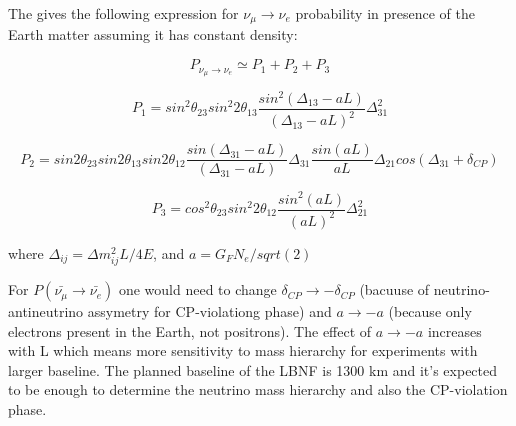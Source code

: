 The \cite{ref_LBNFdoc_volume-physics} gives the following expression for $\nu_\mu \rightarrow \nu_e$ probability in presence of the Earth matter assuming it has constant density: \\
\begin{center}

\begin{equation}
\label{eq:P_bigFormula}
P_{\nu_\mu \rightarrow \nu_e} \simeq P_1 + P_2 + P_3 
\end{equation}

\begin{equation}
\label{eq:P_bigFormula_1}
P_1 = sin^2{\theta_{23}}sin^2{2\theta_{13}}\frac{sin^2(\Delta_{13}-aL)}{(\Delta_{13}-aL)^2}\Delta^2_{31}
\end{equation}

\begin{equation}
\label{eq:P_bigFormula_2}
P_2 = sin2\theta_{23}sin2\theta_{13}sin2\theta_{12}\frac{sin(\Delta_{31}-aL)}{(\Delta_{31}-aL)}\Delta_{31}\frac{sin(aL)}{aL}\Delta_{21}cos(\Delta_{31}+\delta_{CP})
\end{equation}

\begin{equation}
\label{eq:P_bigFormula_3}
P_3 = cos^2\theta_{23}sin^2{2\theta_{12}}\frac{sin^2(aL)}{(aL)^2}\Delta^2_{21}
\end{equation}

where $\Delta_{ij}={\Delta}m^2_{ij}L/4E$, and $a={G_F}{N_e}/sqrt(2)$\\
\end{center}

For $P(\bar{\nu_\mu} \rightarrow \bar{\nu_e})$ one would need to change $\delta_{CP} \rightarrow -\delta_{CP}$ (bacuuse of neutrino-antineutrino assymetry for CP-violationg phase) and $a \rightarrow -a$ (because only electrons present in the Earth, not positrons). The effect of $a \rightarrow -a$ increases with L which means more sensitivity to mass hierarchy for experiments with larger baseline. The planned baseline of the LBNF is 1300 km and it's expected to be enough to determine the neutrino mass hierarchy and also the CP-violation phase.

